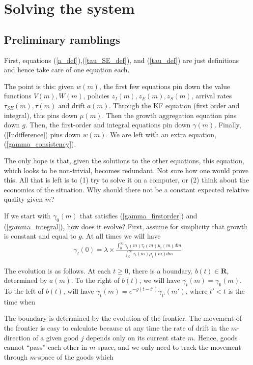 \documentclass[12pt,english]{article}
\theoremstyle{remark}
\begin{document}
\section{Solving the system}

\subsection{Preliminary ramblings}

First, equations (\ref{a_def}),(\ref{tau_SE_def}), and (\ref{tau_def}) are just definitions and hence take care of one equation each. 

The point is this: given $w(m)$, the first few equations pin down the value functions $V(m),W(m)$, policies $z_I(m),z_E(m),z_S(m)$, arrival rates $\tau_{SE}(m),\tau(m)$ and drift $a(m)$. Through the KF equation (first order and integral), this pins down $\mu(m)$. Then the growth aggregation equation pins down $g$. Then, the first-order and integral equations pin down $\gamma(m)$. Finally, (\ref{Indifference}) pins down $w(m)$. We are left with an extra equation, (\ref{gamma_consistency}). 

The only hope is that, given the solutions to the other equations, this equation, which looks to be non-trivial, becomes redundant. Not sure how one would prove this. All that is left is to (1) try to solve it on a computer, or (2) think about the economics of the situation. Why should there not be a constant expected relative quality given $m$? 

If we start with $\gamma_0(m)$ that satisfies (\ref{gamma_firstorder}) and (\ref{gamma_integral}), how does it evolve? First, assume for simplicity that growth is constant and equal to $g$. At all times we will have 
\begin{align*}
	\gamma_t(0) = \lambda \times \frac{\int_{0}^{\infty} \gamma_t(m) \tau_t(m) \mu_t(m) dm}{\int_{0}^{\infty} \tau_t(m) \mu_t(m) dm}
\end{align*}

The evolution is as follows. At each $t \ge 0$, there is a boundary, $b(t) \in \mathbf{R}$, determined by $a(m)$. To the right of $b(t)$, we will have $\gamma_t(m) = \gamma_0(m)$. To the left of $b(t)$, will have $\gamma_t(m) = e^{-g(t-t')} \gamma_{t'} (m')$, where $t' < t$ is the time when 

The boundary is determined by the evolution of the frontier. The movement of the frontier is easy to calculate because at any time the rate of drift in the $m$-direction of a given good $j$ depends only on its current state $m$. Hence, goods cannot ``pass'' each other in $m$-space, and we only need to track the movement through $m$-space of the goods which 
\end{document}
